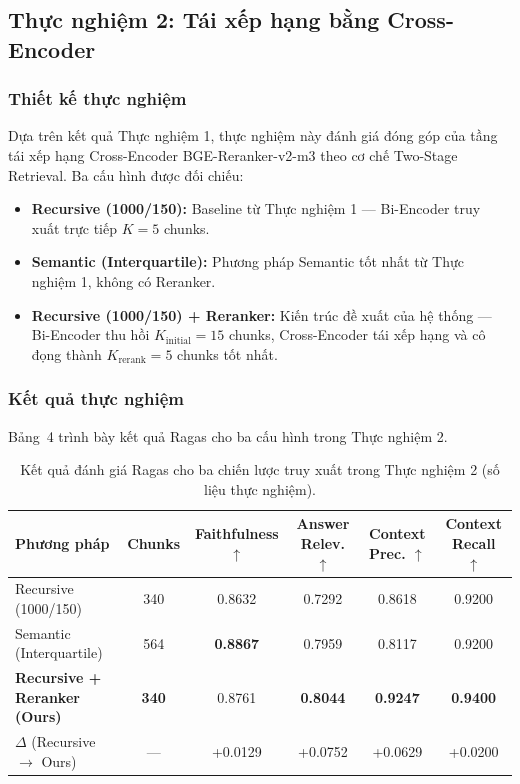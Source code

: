 ﻿\documentclass[12pt]{article}
\begin{document}
\subsection{Thực nghiệm 2: Tái xếp hạng bằng Cross-Encoder}

\subsubsection{Thiết kế thực nghiệm}

Dựa trên kết quả Thực nghiệm 1, thực nghiệm này đánh giá đóng góp của tầng tái xếp hạng Cross-Encoder BGE-Reranker-v2-m3 theo cơ chế Two-Stage Retrieval. Ba cấu hình được đối chiếu:
\begin{itemize}
    \item \textbf{Recursive (1000/150):} Baseline từ Thực nghiệm 1 --- Bi-Encoder truy xuất trực tiếp $K = 5$ chunks.
    \item \textbf{Semantic (Interquartile):} Phương pháp Semantic tốt nhất từ Thực nghiệm 1, không có Reranker.
    \item \textbf{Recursive (1000/150) + Reranker:} Kiến trúc đề xuất của hệ thống --- Bi-Encoder thu hồi $K_{\text{initial}} = 15$ chunks, Cross-Encoder tái xếp hạng và cô đọng thành $K_{\text{rerank}} = 5$ chunks tốt nhất.
\end{itemize}

\subsubsection{Kết quả thực nghiệm}

Bảng~4 trình bày kết quả Ragas cho ba cấu hình trong Thực nghiệm 2.

\begin{table}[H]
\centering
\small
\caption{Kết quả đánh giá Ragas cho ba chiến lược truy xuất trong Thực nghiệm 2 (số liệu thực nghiệm).}
\label{tab:exp2_reranking}
\begin{tabularx}{\linewidth}{@{}l c c c c c@{}}
\toprule
\textbf{Phương pháp} & \textbf{Chunks} & \textbf{Faithfulness} $\uparrow$ & \textbf{Answer Relev.} $\uparrow$ & \textbf{Context Prec.} $\uparrow$ & \textbf{Context Recall} $\uparrow$ \\
\midrule
Recursive (1000/150) & 340 & 0.8632 & 0.7292 & 0.8618 & 0.9200 \\
Semantic (Interquartile) & 564 & \textbf{0.8867} & 0.7959 & 0.8117 & 0.9200 \\
\textbf{Recursive + Reranker (Ours)} & \textbf{340} & 0.8761 & \textbf{0.8044} & \textbf{0.9247} & \textbf{0.9400} \\
\addlinespace[3pt]
$\Delta$ (Recursive $\to$ Ours) & --- & +0.0129 & +0.0752 & +0.0629 & +0.0200 \\
\bottomrule
\end{tabularx}
\par\smallskip
\end{table}
\end{document}
